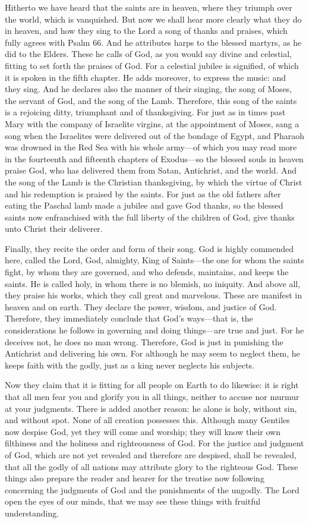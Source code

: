 Hitherto we have heard that the saints are in heaven, where they triumph over the world, which is vanquished. But now we shall hear more clearly what they do in heaven, and how they sing to the Lord a song of thanks and praises, which fully agrees with Psalm 66. And he attributes harps to the blessed martyrs, as he did to the Elders. These he calls of God, as you would say divine and celestial, fitting to set forth the praises of God. For a celestial jubilee is signified, of which it is spoken in the fifth chapter. He adds moreover, to express the music: and they sing. And he declares also the manner of their singing, the song of Moses, the servant of God, and the song of the Lamb. Therefore, this song of the saints is a rejoicing ditty, triumphant and of thanksgiving. For just as in times past Mary with the company of Israelite virgins, at the appointment of Moses, sang a song when the Israelites were delivered out of the bondage of Egypt, and Pharaoh was drowned in the Red Sea with his whole army—of which you may read more in the fourteenth and fifteenth chapters of Exodus—so the blessed souls in heaven praise God, who has delivered them from Satan, Antichrist, and the world. And the song of the Lamb is the Christian thanksgiving, by which the virtue of Christ and his redemption is praised by the saints. For just as the old fathers after eating the Paschal lamb made a jubilee and gave God thanks, so the blessed saints now enfranchised with the full liberty of the children of God, give thanks unto Christ their deliverer.

Finally, they recite the order and form of their song. God is highly commended here, called the Lord, God, almighty, King of Saints—the one for whom the saints fight, by whom they are governed, and who defends, maintains, and keeps the saints. He is called holy, in whom there is no blemish, no iniquity. And above all, they praise his works, which they call great and marvelous. These are manifest in heaven and on earth. They declare the power, wisdom, and justice of God. Therefore, they immediately conclude that God’s ways—that is, the considerations he follows in governing and doing things—are true and just. For he deceives not, he does no man wrong. Therefore, God is just in punishing the Antichrist and delivering his own. For although he may seem to neglect them, he keeps faith with the godly, just as a king never neglects his subjects.

Now they claim that it is fitting for all people on Earth to do likewise: it is right that all men fear you and glorify you in all things, neither to accuse nor murmur at your judgments. There is added another reason: he alone is holy, without sin, and without spot. None of all creation possesses this. Although many Gentiles now despise God, yet they will come and worship; they will know their own filthiness and the holiness and righteousness of God. For the justice and judgment of God, which are not yet revealed and therefore are despised, shall be revealed, that all the godly of all nations may attribute glory to the righteous God. These things also prepare the reader and hearer for the treatise now following concerning the judgments of God and the punishments of the ungodly. The Lord open the eyes of our minds, that we may see these things with fruitful understanding.
